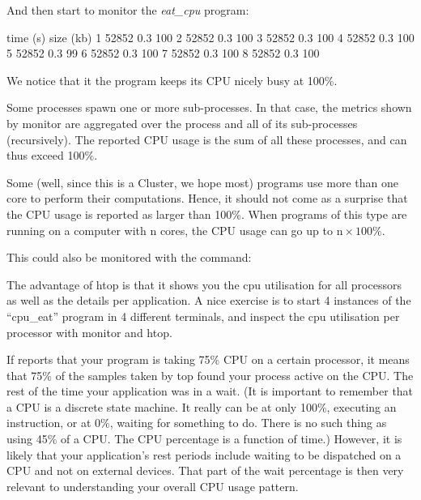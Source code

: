   And then start to monitor the \emph{eat\_cpu} program:

\begin{prompt}
time  (s) size (kb) %
1  52852  0.3 100
2  52852  0.3 100
3  52852  0.3 100
4  52852  0.3 100
5  52852  0.3  99
6  52852  0.3 100
7  52852  0.3 100
8  52852  0.3 100
\end{prompt}

  We notice that it the program keeps its CPU nicely busy at 100\%.

  Some processes spawn one or more sub-processes. In that case, the metrics shown
  by monitor are aggregated over the process and all of its sub-processes
  (recursively). The reported CPU usage is the sum of all these processes, and
  can thus exceed 100\%.

  Some (well, since this is a \hpc Cluster, we hope most) programs use more
  than one core to perform their computations. Hence, it should not come as a
  surprise that the CPU usage is reported as larger than 100\%. When programs of
  this type are running on a computer with n cores, the CPU usage can go up to $\text{n}
  \times 100\%$.
\fi

This could also be monitored with the  command:

\begin{prompt}
\end{prompt}

\vbox{}


The advantage of htop is that it shows you the cpu utilisation for all
processors as well as the details per application.  A nice exercise is to start
4 instances of the ``cpu\_eat'' program in 4 different terminals, and inspect
the cpu utilisation per processor with monitor and htop.

If  reports that your program is taking 75\% CPU on a
certain processor, it means that 75\% of the samples taken by top found your
process active on the CPU. The rest of the time your application was in a wait.
(It is important to remember that a CPU is a discrete state machine. It really
can be at only 100\%, executing an instruction, or at 0\%, waiting for
something to do. There is no such thing as using 45\% of a CPU. The CPU
percentage is a function of time.) However, it is likely that your
application's rest periods include waiting to be dispatched on a CPU and not on
external devices. That part of the wait percentage is then very relevant to
understanding your overall CPU usage pattern.

